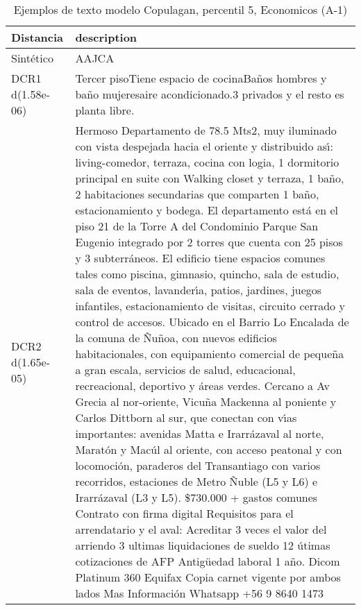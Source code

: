 \begin{table}[H]
\centering
\fontsize{10}{14}\selectfont
\caption{Ejemplos de texto modelo Copulagan, percentil 5, Economicos (A-1)}
\label{table-example-economicos-a-1-copulagan-5p-text}
\begin{tabular}{|l|m{35em}|}
\hline
\rowcolor[gray]{0.8}
Distancia & description \\
\hline Sintético & AAJCA \\
\hline DCR1 d(1.58e-06) & Tercer pisoTiene espacio de cocinaBa\~nos hombres y ba\~no mujeresaire acondicionado.3 privados y el resto es planta libre. \\
\hline DCR2 d(1.65e-05) & Hermoso Departamento de 78.5 Mts2, muy iluminado con vista despejada hacia el oriente y distribuido as{\'\i}: living-comedor, terraza, cocina con logia, 1 dormitorio principal en suite con Walking closet y terraza, 1 ba\~no, 2 habitaciones secundarias que comparten 1 ba\~no, estacionamiento y bodega. El departamento est\'a en el piso 21 de la Torre A del Condominio Parque San Eugenio integrado por 2 torres que cuenta con 25 pisos y 3 subterr\'aneos.  El edificio tiene espacios comunes tales como piscina, gimnasio, quincho, sala de estudio, sala de eventos, lavander{\'\i}a, patios, jardines, juegos infantiles, estacionamiento de visitas, circuito cerrado y control de accesos. Ubicado en el Barrio Lo Encalada de la comuna de \~Nu\~noa, con nuevos edificios habitacionales, con equipamiento comercial de peque\~na a gran escala, servicios de salud, educacional, recreacional, deportivo y \'areas verdes. Cercano a Av Grecia al nor-oriente, Vicu\~na Mackenna al poniente y Carlos Dittborn al sur, que conectan con v{\'\i}as importantes: avenidas Matta e Irarr\'azaval al norte, Marat\'on y Mac\'ul al oriente, con acceso peatonal y con locomoci\'on, paraderos del Transantiago con varios recorridos, estaciones de Metro \~Nuble (L5 y L6) e Irarr\'azaval (L3 y L5).  \$730.000 + gastos comunes Contrato con firma digital  Requisitos para el arrendatario y el aval:  Acreditar 3 veces el valor del arriendo 3 ultimas liquidaciones de sueldo 12 \'utimas cotizaciones de AFP Antig\"uedad laboral 1 a\~no. Dicom Platinum 360 Equifax Copia carnet vigente por ambos lados Mas Informaci\'on Whatsapp +56 9 8640 1473 \\
\hline
\end{tabular}
\end{table}
